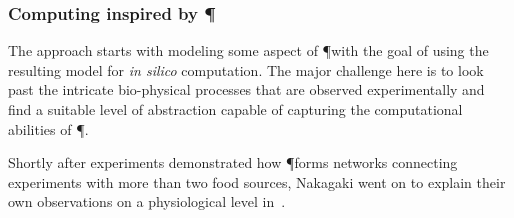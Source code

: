 


		\subsubsection{Computing inspired by \P}

			The approach starts with modeling some aspect of \P with the goal of using the resulting model for \textit{in silico} computation. The major challenge here is to look past the intricate bio-physical processes that are observed experimentally and find a suitable level of abstraction capable of capturing the computational abilities of \P.
			
			Shortly after experiments demonstrated how \P forms networks connecting experiments with more than two food sources, Nakagaki \etal went on to explain their own observations on a physiological level in~\cite{Tero2006115}. 

